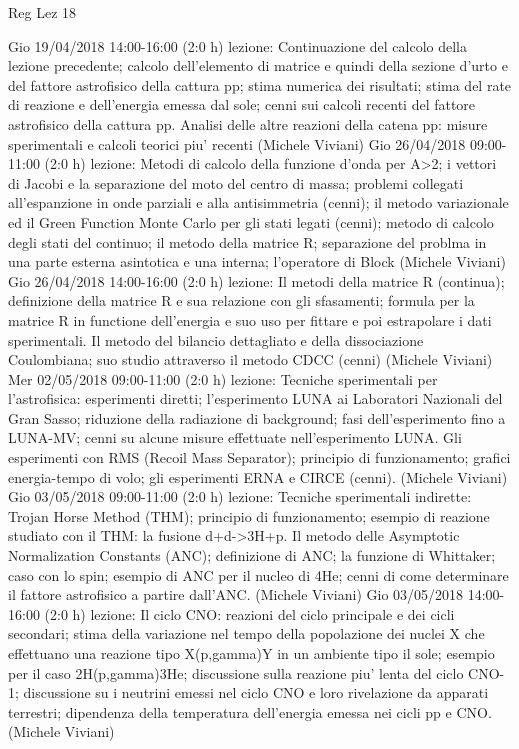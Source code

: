 \begin{frame}[allowframebreaks]{Reg Lez 18}
\begin{itemize}
    Gio 19/04/2018 14:00-16:00 (2:0 h) lezione: Continuazione del calcolo della lezione precedente; calcolo dell'elemento di matrice e quindi della sezione d'urto e del fattore astrofisico della cattura pp; stima numerica dei risultati; stima del rate di reazione e dell'energia emessa dal sole; cenni sui calcoli recenti del fattore astrofisico della cattura pp. Analisi delle altre reazioni della catena pp: misure sperimentali e calcoli teorici piu' recenti (Michele Viviani)
    Gio 26/04/2018 09:00-11:00 (2:0 h) lezione: Metodi di calcolo della funzione d'onda per A>2; i vettori di Jacobi e la separazione del moto del centro di massa; problemi collegati all'espanzione in onde parziali e alla antisimmetria (cenni); il metodo variazionale ed il Green Function Monte Carlo per gli stati legati (cenni); metodo di calcolo degli stati del continuo; il metodo della matrice R; separazione del problma in una parte esterna asintotica e una interna; l'operatore di Block (Michele Viviani)
    Gio 26/04/2018 14:00-16:00 (2:0 h) lezione: Il metodi della matrice R (continua); definizione della matrice R e sua relazione con gli sfasamenti; formula per la matrice R in functione dell'energia e suo uso per fittare e poi estrapolare i dati sperimentali. Il metodo del bilancio dettagliato e della dissociazione Coulombiana; suo studio attraverso il metodo CDCC (cenni) (Michele Viviani)
    Mer 02/05/2018 09:00-11:00 (2:0 h) lezione: Tecniche sperimentali per l'astrofisica: esperimenti diretti; l'esperimento LUNA ai Laboratori Nazionali del Gran Sasso; riduzione della radiazione di background; fasi dell'esperimento fino a LUNA-MV; cenni su alcune misure effettuate nell'esperimento LUNA. Gli esperimenti con RMS (Recoil Mass Separator); principio di funzionamento; grafici energia-tempo di volo; gli esperimenti ERNA e CIRCE (cenni). (Michele Viviani)
    Gio 03/05/2018 09:00-11:00 (2:0 h) lezione: Tecniche sperimentali indirette: Trojan Horse Method (THM); principio di funzionamento; esempio di reazione studiato con il THM: la fusione d+d->3H+p. Il metodo delle Asymptotic Normalization Constants (ANC); definizione di ANC; la funzione di Whittaker; caso con lo spin; esempio di ANC per il nucleo di 4He; cenni di come determinare il fattore astrofisico a partire dall'ANC. (Michele Viviani)
    Gio 03/05/2018 14:00-16:00 (2:0 h) lezione: Il ciclo CNO: reazioni del ciclo principale e dei cicli secondari; stima della variazione nel tempo della popolazione dei nuclei X che effettuano una reazione tipo X(p,gamma)Y in un ambiente tipo il sole; esempio per il caso 2H(p,gamma)3He; discussione sulla reazione piu' lenta del ciclo CNO-1; discussione su i neutrini emessi nel ciclo CNO e loro rivelazione da apparati terrestri; dipendenza della temperatura dell'energia emessa nei cicli pp e CNO. (Michele Viviani)

\end{itemize}
\end{frame}
